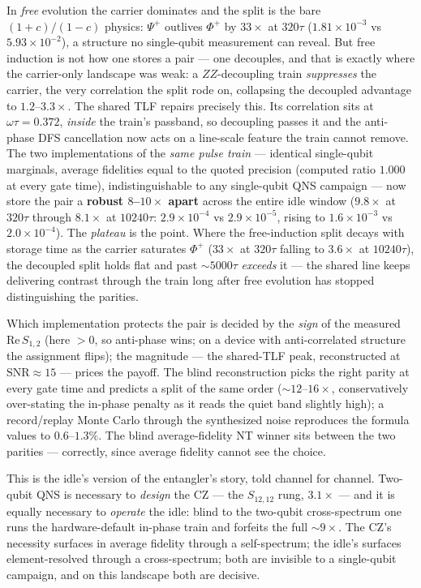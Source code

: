 \documentclass[10pt]{article}
\begin{document}
In \emph{free} evolution the carrier dominates and the split is the bare
$(1+c)/(1-c)$ physics: $\Psi^+$ outlives $\Phi^+$ by $33\times$ at $320\tau$
($1.81\times10^{-3}$ vs $5.93\times10^{-2}$), a structure no single-qubit
measurement can reveal. But free induction is not how one stores a pair ---
one decouples, and that is exactly where the carrier-only landscape was weak:
a $ZZ$-decoupling train \emph{suppresses} the carrier, the very correlation
the split rode on, collapsing the decoupled advantage to $1.2$--$3.3\times$.
The shared TLF repairs precisely this. Its correlation sits at
$\omega\tau = 0.372$, \emph{inside} the train's passband, so decoupling passes
it and the anti-phase DFS cancellation now acts on a line-scale feature the
train cannot remove. The two implementations of the \emph{same pulse train}
--- identical single-qubit marginals, average fidelities equal to the quoted
precision (computed ratio $1.000$ at every gate time), indistinguishable to
any single-qubit QNS campaign --- now store the pair a \textbf{robust
$8$--$10\times$ apart} across the entire idle window ($9.8\times$ at $320\tau$
through $8.1\times$ at $10240\tau$: $2.9\times10^{-4}$ vs $2.9\times10^{-5}$,
rising to $1.6\times10^{-3}$ vs $2.0\times10^{-4}$). The \emph{plateau} is the
point. Where the free-induction split decays with storage time as the carrier
saturates $\Phi^+$ ($33\times$ at $320\tau$ falling to $3.6\times$ at
$10240\tau$), the decoupled split holds flat and past $\sim 5000\tau$
\emph{exceeds} it --- the shared line keeps delivering contrast through the
train long after free evolution has stopped distinguishing the parities.

Which implementation protects the pair is decided by the \emph{sign} of the
measured $\mathrm{Re}\,S_{1,2}$ (here $>0$, so anti-phase wins; on a device
with anti-correlated structure the assignment flips); the magnitude --- the
shared-TLF peak, reconstructed at $\mathrm{SNR}\approx 15$ --- prices the
payoff. The blind reconstruction picks the right parity at every gate time and
predicts a split of the same order ($\sim 12$--$16\times$, conservatively
over-stating the in-phase penalty as it reads the quiet band slightly high);
a record/replay Monte Carlo through the synthesized noise reproduces the
formula values to $0.6$--$1.3\%$. The blind average-fidelity NT winner
sits between the two parities --- correctly, since average fidelity cannot
see the choice.

This is the idle's version of the entangler's story, told channel for channel.
Two-qubit QNS is necessary to \emph{design} the CZ --- the $S_{12,12}$ rung,
$3.1\times$ --- and it is equally necessary to \emph{operate} the idle: blind
to the two-qubit cross-spectrum one runs the hardware-default in-phase train
and forfeits the full $\sim 9\times$. The CZ's necessity surfaces in average
fidelity through a self-spectrum; the idle's surfaces element-resolved through
a cross-spectrum; both are invisible to a single-qubit campaign, and on this
landscape both are decisive.
\end{document}
